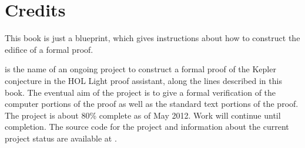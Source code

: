 
\chapter{Credits}\label{sec:credit}

This book is just a blueprint, which gives instructions about how to
construct the edifice of a formal proof. 

 is the name of an ongoing project to construct a
formal proof of the Kepler conjecture in the HOL Light proof
assistant, along the lines described in this book.  The eventual aim
of the project is to give a formal verification of the computer
portions of the proof as well as the standard text portions of the
proof.  The project is about 80\% complete as of May 2012.  Work will
continue until completion.  The source code for the project and
information about the current project status are available at
\cite{website:FlyspeckProject}.



